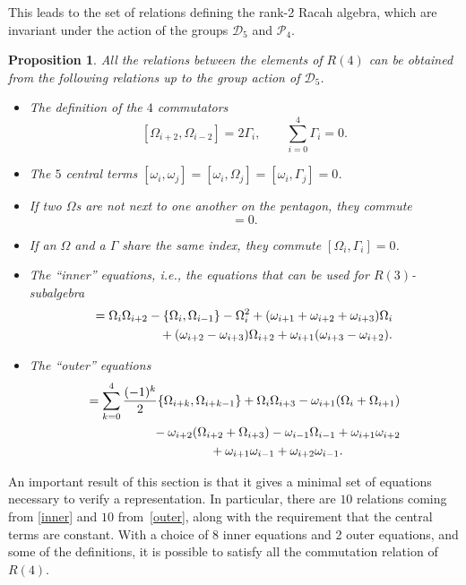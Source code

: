 \documentclass[10pt,a4paper]{amsart}
\numberwithin{equation}{section}
\newtheorem{Proposition}[Theorem]{Proposition}
 { \theoremstyle{definition}
\newtheorem{Definition}[Theorem]{Definition}
\newtheorem{Note}[Theorem]{Note}
\newtheorem{Example}[Theorem]{Example}
\newtheorem{Remark}[Theorem]{Remark} }
\begin{document}
This leads to the set of relations defining the rank-2 Racah algebra, which are invariant under the action of the groups $\mathcal{D}_5$ and $\mathcal{P}_4$.
\begin{Proposition}
All the relations between the elements of $R(4)$ can be obtained from the following relations up to the group action of $\mathcal{D}_5$.
\begin{itemize}\itemsep=0pt
  \item The definition of the $4$ commutators
  \[
    [\Omega_{i+2},\Omega_{i-2}]=2\Gamma_i,\qquad
    \sum_{i=0}^4\Gamma_i=0.
  \]
  \item The $5$ central terms
$
    [\omega_i,\omega_j]=[\omega_i,\Omega_j]=[\omega_i,\Gamma_j]=0$.
  \item If two $\Omega$s are not next to one another on the pentagon, they commute
  \begin{equation}
    [\Omega_{i-1},\Omega_{i+1}]=0.\label{OmegaGamma0}
  \end{equation}
  \item If an $\Omega$ and a $\Gamma$ share the same index, they commute $[\Omega_i,\Gamma_i]=0$.
  \item The ``inner'' equations, i.e., the equations that can be used for $R(3)$-subalgebra
  \begin{gather}
    [\Omega_i,\Gamma_{i+2}]= \Omega_i\Omega_{i+2}-\lbrace \Omega_i,\Omega_{i-1}\rbrace-\Omega_i^2+(\omega_{i+1}+\omega_{i+2}+\omega_{i+3})\Omega_i\nonumber\\
\hphantom{[\Omega_i,\Gamma_{i+2}]=}{} +(\omega_{i+2}-\omega_{i+3})\Omega_{i+2}+\omega_{i+1}(\omega_{i+3}-\omega_{i+2}).\label{inner}
  \end{gather}
  \item The ``outer'' equations
  \begin{gather}
[\Omega_i,\Gamma_{i+1}]= \sum_{k=0}^4\frac{(-1)^k}{2}\lbrace \Omega_{i+k},\Omega_{i+k-1}\rbrace+\Omega_i\Omega_{i+3}-\omega_{i+1}(\Omega_i+\Omega_{i+1})\nonumber\\
\hphantom{[\Omega_i,\Gamma_{i+1}]=}{} -\omega_{i+2}(\Omega_{i+2}+\Omega_{i+3})-\omega_{i-1}\Omega_{i-1}+\omega_{i+1}\omega_{i+2}\nonumber\\
\hphantom{[\Omega_i,\Gamma_{i+1}]=}{} +\omega_{i+1}\omega_{i-1}+\omega_{i+2}\omega_{i-1}.\label{outer}
  \end{gather}
\end{itemize}
\end{Proposition}

An important result of this section is that it gives a minimal set of equations necessary to verify a representation. In particular, there are $10$ relations coming from \eqref{inner} and $10$ from~\eqref{outer}, along with the requirement that the central terms are constant. With a choice of 8 inner equations and 2 outer equations, and some of the definitions, it is possible to satisfy all the commutation relation of $R(4)$.
\end{document}
